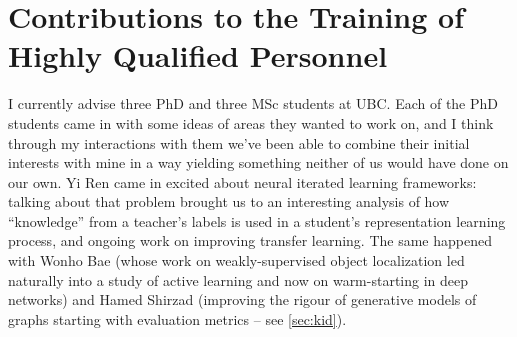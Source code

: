 \documentclass[12pt]{article}
\begin{document}
\section{Contributions to the Training of Highly Qualified Personnel}
I currently advise three PhD and three MSc students at UBC.
%
Each of the PhD students came in with some ideas of areas they wanted to work on,
and I think through my interactions with them we've been able to combine their initial interests with mine in a way yielding something neither of us would have done on our own.
Yi Ren came in excited about neural iterated learning frameworks:
talking about that problem brought us to an interesting analysis of how ``knowledge'' from a teacher's labels is used in a student's representation learning process,
and ongoing work on improving transfer learning.
The same happened with Wonho Bae
(whose work on weakly-supervised object localization led naturally into a study of active learning and now on warm-starting in deep networks)
and Hamed Shirzad (improving the rigour of generative models of graphs starting with evaluation metrics -- see \cref{sec:kid}).
\end{document}
